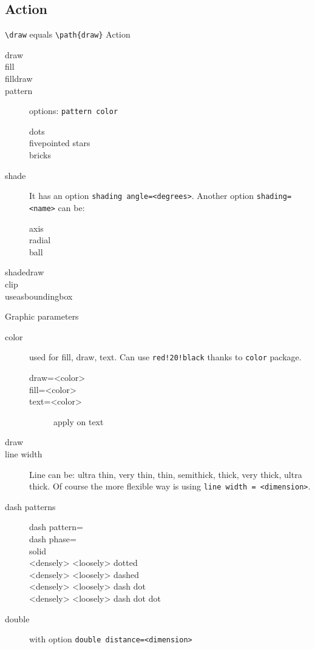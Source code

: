 \subsection{Action}
\verb$\draw$ equals \verb$\path{draw}$
Action
\begin{description}
\item [draw]
\item [fill]
\item [filldraw]
\item [pattern] options: \texttt{pattern color}
  \begin{description}
  \item [dots]
  \item [fivepointed stars]
  \item [bricks]
  \end{description}
\item [shade] It has an option \texttt{shading
    angle=<degrees>}. Another option \texttt{shading=<name>} can be:
  \begin{description}
  \item [axis]
  \item [radial]
  \item [ball]
  \end{description}
\item [shadedraw]
\item [clip]
\item [useasboundingbox]
\end{description}


Graphic parameters
\begin{description}
\item [color] used for fill, draw, text. Can use \texttt{red!20!black}
  thanks to \texttt{color} package.
  \begin{description}
  \item [draw=<color>]
  \item [fill=<color>]
  \item [text=<color>] apply on text
  \end{description}

\item [draw] 
\item [line width] Line can be: ultra thin, very thin, thin,
  semithick, thick, very thick, ultra thick. Of course the more
  flexible way is using \texttt{line width = <dimension>}.
\item [dash patterns]
  \begin{description}
  \item [dash pattern=]
  \item [dash phase=]
  \item [solid]
  \item [<densely> <loosely> dotted]
  \item [<densely> <loosely> dashed]
  \item [<densely> <loosely> dash dot]
  \item [<densely> <loosely> dash dot dot]
  \end{description}
\item [double] with option \texttt{double distance=<dimension>}
\end{description}

